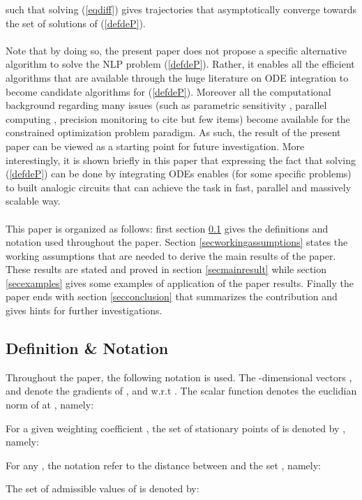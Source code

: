\documentclass{article}
\begin{document}
such that solving (\ref{eqdiff}) gives trajectories that asymptotically converge towards the set of solutions of (\ref{defdeP}). \ \\ \ \\ 
Note that by doing so, the present paper does not propose a specific alternative algorithm to solve the NLP problem (\ref{defdeP}). Rather, it enables all the efficient algorithms that are available through the huge literature on ODE integration to become candidate algorithms for (\ref{defdeP}). Moreover all the computational background regarding many issues (such as parametric sensitivity \cite{Leis:1988}, parallel computing \cite{Voss199765},  precision monitoring to cite but few items) become  available for the constrained optimization problem paradigm. As such, the result of the present paper can be viewed as a starting point for future investigation. More interestingly, it is shown briefly in this paper that expressing the fact that solving (\ref{defdeP}) can be done by integrating ODEs enables (for some specific problems) to built analogic circuits that can achieve the task in fast, parallel and massively scalable way. \ \\ \ \\ 
This paper is organized as follows: first section \ref{secdefnot} gives the definitions and notation used throughout the paper. Section \ref{secworkingassumptions} states the working assumptions that are needed to derive the main results of the paper. These results are stated and proved in section \ref{secmainresult} while section \ref{secexamples} gives some examples of application of the paper results. Finally the paper ends with section \ref{secconclusion} that summarizes the contribution and gives hints for further investigations.    
\subsection{Definition \& Notation} \label{secdefnot} 
\noindent Throughout the paper, the following notation is used. The -dimensional vectors ,  and  denote the gradients of ,  and  w.r.t . The scalar function  denotes the euclidian norm of  at , namely:
 
For a given weighting coefficient , the set of stationary points of  is denoted by , namely:
 
For any , the notation  refer to the distance between  and the set , namely:
 
The set of admissible values of  is denoted by:
 
\end{document}

